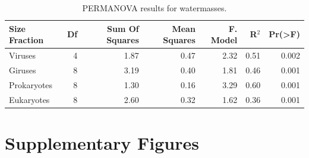 \documentclass[fleqn,10pt]{wlscirep}
\begin{document}
\begin{table}[ht]
\centering
\begin{tabular}{lrrrrrr}
\hline
Size Fraction & Df & Sum Of Squares & Mean Squares & F. Model & R$^2$ & Pr(>F) \\
\hline
\hline
Viruses	& 4	& 1.87 &	0.47 & 2.32 &	0.51 &	0.002\\
Giruses	& 8	& 3.19 &	0.40 & 1.81 &	0.46 &	0.001\\
Prokaryotes & 8	& 1.30 &	0.16 & 3.29 &	0.60 &	0.001\\
Eukaryotes	& 8	& 2.60 &	0.32 & 1.62 &	0.36 &	0.001\\
\hline
\hline
\end{tabular}
\caption{\label{tab:PWM} PERMANOVA results for watermasses.}
\end{table}

\clearpage

\section*{Supplementary Figures}
\end{document}
